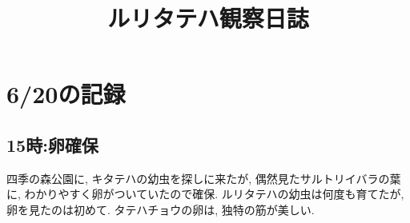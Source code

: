 \documentclass{jsarticle}
\title{ルリタテハ観察日誌}
\begin{document}
\maketitle

\section{6/20の記録}
\subsection{15時:卵確保}
四季の森公園に, キタテハの幼虫を探しに来たが, 偶然見たサルトリイバラの葉に, わかりやすく卵がついていたので確保. 
ルリタテハの幼虫は何度も育てたが, 卵を見たのは初めて. タテハチョウの卵は, 独特の筋が美しい. 
\end{document}
